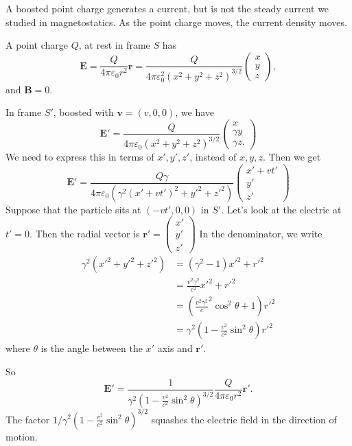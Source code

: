 \documentclass[a4paper]{article}
\begin{document}
\begin{eg}
  A boosted point charge generates a current, but is not the steady current we studied in magnetostatics. As the point charge moves, the current density moves.

  A point charge $Q$, at rest in frame $S$ has
  \[
    \mathbf{E} = \frac{Q}{4\pi \varepsilon_0 r^2}\hat{\mathbf{r}} = \frac{Q}{4\pi \varepsilon_0^2(x^2 + y^2 + z^2)^{3/2}}
    \begin{pmatrix}
      x\\y\\z
    \end{pmatrix},
  \]
  and $\mathbf{B} = 0$.

  In frame $S'$, boosted with $\mathbf{v} = (v, 0, 0)$, we have
  \[
    \mathbf{E}' = \frac{Q}{4\pi \varepsilon_0(x^2 + y^2 + z^2)^{3/2}}
    \begin{pmatrix}
      x\\ \gamma y\\ \gamma z.
    \end{pmatrix}
  \]
  We need to express this in terms of $x', y', z'$, instead of $x, y, z$. Then we get
  \[
    \mathbf{E}' = \frac{Q\gamma}{4\pi \varepsilon_0 (\gamma^2(x' + vt')^2 + y'^2 + z'^2)}
    \begin{pmatrix}
      x' + vt'\\y'\\z'
    \end{pmatrix}
  \]
  Suppose that the particle sits at $(-vt', 0, 0)$ in $S'$. Let's look at the electric at $t'=0$. Then the radial vector is $\mathbf{r}' =
  \begin{pmatrix}
    x'\\y'\\z'
  \end{pmatrix}
  $
  In the denominator, we write
  \begin{align*}
    \gamma^2(x'^2 + y'^2 + z'^2) &= (\gamma^2 - 1)x'^2 + r'^2\\
    &= \frac{v^2\gamma^2}{c^2}x'^2 + r'^2\\
    &= \left(\frac{v^2\gamma^2}c^2 \cos^2 \theta + 1\right)r'^2\\
    &= \gamma^2\left(1 - \frac{v^2}{c^2}\sin^2 \theta\right)r'^2
  \end{align*}
  where $\theta$ is the angle between the $x'$ axis and $\mathbf{r}'$.

  So
  \[
    \mathbf{E}' = \frac{1}{\gamma^2\left(1 - \frac{v^2}{c^2}\sin^2 \theta\right)^{3/2}}\frac{Q}{4\pi \varepsilon_0 r^2}\hat{\mathbf{r}'}.
  \]
  The factor $1/\gamma^2\left(1  - \frac{v^2}{c^2}\sin^2 \theta\right)^{3/2}$ squashes the electric field in the direction of motion.


\end{eg}
\end{document}
